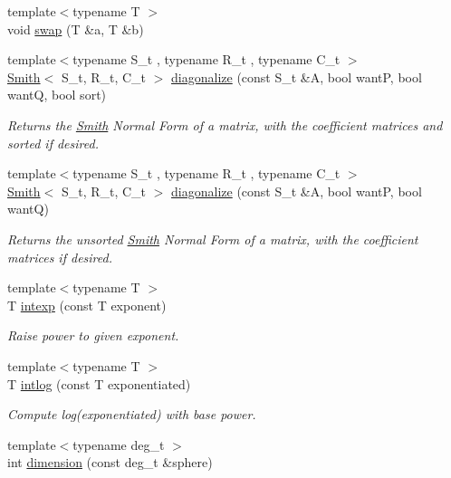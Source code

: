 \begin{DoxyCompactItemize}
{\footnotesize template$<$typename T $>$ }\\void \hyperlink{namespaceMackey_aabed38680919594c4ba5eaa6730a7f82}{swap} (T \&a, T \&b)
\item 
{\footnotesize template$<$typename S\+\_\+t , typename R\+\_\+t , typename C\+\_\+t $>$ }\\\hyperlink{classMackey_1_1Smith}{Smith}$<$ S\+\_\+t, R\+\_\+t, C\+\_\+t $>$ \hyperlink{namespaceMackey_a276ffc8b4c9c52cfde39cd3da3c88cc9}{diagonalize} (const S\+\_\+t \&A, bool wantP, bool wantQ, bool sort)
\begin{DoxyCompactList}\small\item\em Returns the \hyperlink{classMackey_1_1Smith}{Smith} Normal Form of a matrix, with the coefficient matrices and sorted if desired. \end{DoxyCompactList}\item 
{\footnotesize template$<$typename S\+\_\+t , typename R\+\_\+t , typename C\+\_\+t $>$ }\\\hyperlink{classMackey_1_1Smith}{Smith}$<$ S\+\_\+t, R\+\_\+t, C\+\_\+t $>$ \hyperlink{namespaceMackey_a2f26791310db25c7e42bf5341fdfd48d}{diagonalize} (const S\+\_\+t \&A, bool wantP, bool wantQ)
\begin{DoxyCompactList}\small\item\em Returns the unsorted \hyperlink{classMackey_1_1Smith}{Smith} Normal Form of a matrix, with the coefficient matrices if desired. \end{DoxyCompactList}\item 
{\footnotesize template$<$typename T $>$ }\\T \hyperlink{namespaceMackey_a4904fdc0fdcf3c23d7f3b80f59b2eafa}{intexp} (const T exponent)
\begin{DoxyCompactList}\small\item\em Raise power to given exponent. \end{DoxyCompactList}\item 
{\footnotesize template$<$typename T $>$ }\\T \hyperlink{namespaceMackey_aa0cac9097035c5fe8448742e22e6f78b}{intlog} (const T exponentiated)
\begin{DoxyCompactList}\small\item\em Compute log(exponentiated) with base power. \end{DoxyCompactList}\item 
{\footnotesize template$<$typename deg\+\_\+t $>$ }\\int \hyperlink{namespaceMackey_a6a5d40e69e5628ea84896ee43f4a91fa}{dimension} (const deg\+\_\+t \&sphere)

\end{DoxyCompactItemize}
